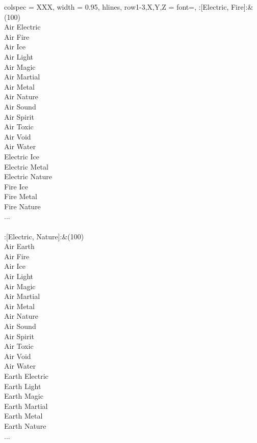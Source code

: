 \begin{longtblr}[
	caption = {2v2 Defending Weak},
	label = {2v2-Defending-Weak},
]{
	colspec = {XXX}, width = 0.95\linewidth,
	hlines,
	row{1-3,X,Y,Z} = {font=\bfseries},
}
	:[Electric, Fire]:&{(100)\\
	Air Electric \\
	Air Fire \\
	Air Ice \\
	Air Light \\
	Air Magic \\
	Air Martial \\
	Air Metal \\
	Air Nature \\
	Air Sound \\
	Air Spirit \\
	Air Toxic \\
	Air Void \\
	Air Water \\
	Electric Ice \\
	Electric Metal \\
	Electric Nature \\
	Fire Ice \\
	Fire Metal \\
	Fire Nature \\
	...\\
	}\\

	:[Electric, Nature]:&{(100)\\
	Air Earth \\
	Air Fire \\
	Air Ice \\
	Air Light \\
	Air Magic \\
	Air Martial \\
	Air Metal \\
	Air Nature \\
	Air Sound \\
	Air Spirit \\
	Air Toxic \\
	Air Void \\
	Air Water \\
	Earth Electric \\
	Earth Light \\
	Earth Magic \\
	Earth Martial \\
	Earth Metal \\
	Earth Nature \\
	...\\
	}\\


\end{longtblr}
